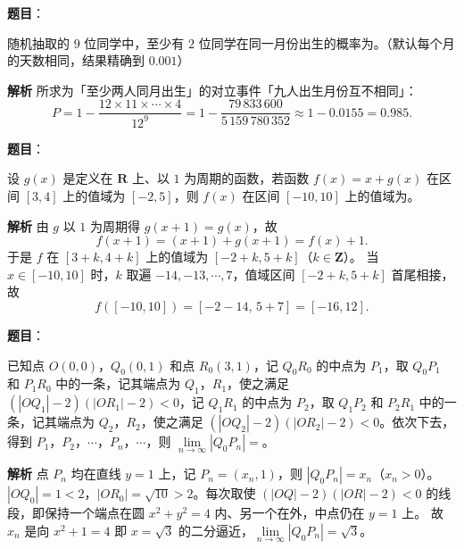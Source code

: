 \begin{answer}

\textbf{题目}：

随机抽取的 $9$ 位同学中，至少有 $2$ 位同学在同一月份出生的概率为\gkblank{}。（默认每个月的天数相同，结果精确到 $0.001$）

\textbf{解析}
所求为「至少两人同月出生」的对立事件「九人出生月份互不相同」：
\nopagebreak[4]
\[P=1-\frac{12\times11\times\cdots\times4}{12^9}=1-\frac{79\,833\,600}{5\,159\,780\,352}\approx1-0.0155=0.985.\]


\end{answer}
\begin{answer}

\textbf{题目}：

设 $g(x)$ 是定义在 $\mathbf R$ 上、以 $1$ 为周期的函数，若函数 $f(x)=x+g(x)$ 在区间 $[3,4]$ 上的值域为 $[-2,5]$，则 $f(x)$ 在区间 $[-10,10]$ 上的值域为\gkblank{}。

\textbf{解析}
由 $g$ 以 $1$ 为周期得 $g(x+1)=g(x)$，故
\nopagebreak[4]
\[f(x+1)=(x+1)+g(x+1)=f(x)+1.\]
于是 $f$ 在 $[3+k,4+k]$ 上的值域为 $[-2+k,5+k]$（$k\in\mathbf Z$）。
当 $x\in[-10,10]$ 时，$k$ 取遍 $-14,-13,\cdots,7$，值域区间 $[-2+k,5+k]$ 首尾相接，故
\nopagebreak[4]
\[f([-10,10])=[-2-14,\,5+7]=[-16,12].\]


\end{answer}
\begin{answer}

\textbf{题目}：

已知点 $O(0,0)$，$Q_0(0,1)$ 和点 $R_0(3,1)$，记 $Q_0R_0$ 的中点为 $P_1$，取 $Q_0P_1$ 和 $P_1R_0$ 中的一条，记其端点为 $Q_1$，$R_1$，使之满足 $(|OQ_1|-2)(|OR_1|-2)<0$，记 $Q_1R_1$ 的中点为 $P_2$，取 $Q_1P_2$ 和 $P_2R_1$ 中的一条，记其端点为 $Q_2$，$R_2$，使之满足 $(|OQ_2|-2)(|OR_2|-2)<0$。依次下去，得到 $P_1$，$P_2$，$\cdots$，$P_n$，$\cdots$，则 $\lim\limits_{n\to\infty}|Q_0P_n|=$\gkblank{}。

\textbf{解析}
点 $P_n$ 均在直线 $y=1$ 上，记 $P_n=(x_n,1)$，则 $|Q_0P_n|=x_n$（$x_n>0$）。
$|OQ_0|=1<2$，$|OR_0|=\sqrt{10}>2$。每次取使 $(|OQ|-2)(|OR|-2)<0$ 的线段，即保持一个端点在圆 $x^2+y^2=4$ 内、另一个在外，中点仍在 $y=1$ 上。
故 $x_n$ 是向 $x^2+1=4$ 即 $x=\sqrt3$ 的二分逼近，$\lim\limits_{n\to\infty}|Q_0P_n|=\sqrt3$。


\end{answer}
